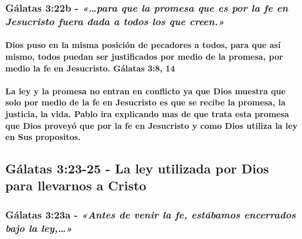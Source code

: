 \documentclass[11a pt,twoside]{article}
\newcommand{\scripture}[1]{%
  {\fontsize{12pt}{16pt}\selectfont\ScriptureFont\itshape #1}%
}
\let\oldsubsection\subsection
\renewcommand{\subsection}{\needspace{5\baselineskip}\oldsubsection}
\let\oldsubsubsection\subsubsection
\renewcommand{\subsubsection}{\needspace{4\baselineskip}\oldsubsubsection}
\let\oldparagraph\paragraph
\renewcommand{\paragraph}{\needspace{3\baselineskip}\oldparagraph}
\begin{document}
\subsubsection{\texorpdfstring{Gálatas 3:22b -
\scripture{«…para que la promesa que es por la fe en Jesucristo fuera dada a todos los que creen.»}}{Gálatas 3:22b - }}\label{guxe1latas-322b---para-que-la-promesa-que-es-por-la-fe-en-jesucristo-fuera-dada-a-todos-los-que-creen.}

\paragraph{Dios puso en la misma posición de pecadores a todos, para que
así mismo, todos puedan ser justificados por medio de la promesa, por
medio la fe en Jesucristo. Gálatas 3:8,
14}\label{dios-puso-en-la-misma-posiciuxf3n-de-pecadores-a-todos-para-que-asuxed-mismo-todos-puedan-ser-justificados-por-medio-de-la-promesa-por-medio-la-fe-en-jesucristo.-guxe1latas-38-14}

\paragraph{La ley y la promesa no entran en conflicto ya que Dios
muestra que solo por medio de la fe en Jesucristo es que se recibe la
promesa, la justicia, la vida. Pablo ira explicando mas de que trata
esta promesa que Dios proveyó que por la fe en Jesucristo y como Dios
utiliza la ley en Sus
propositos.}\label{la-ley-y-la-promesa-no-entran-en-conflicto-ya-que-dios-muestra-que-solo-por-medio-de-la-fe-en-jesucristo-es-que-se-recibe-la-promesa-la-justicia-la-vida.-pablo-ira-explicando-mas-de-que-trata-esta-promesa-que-dios-proveyuxf3-que-por-la-fe-en-jesucristo-y-como-dios-utiliza-la-ley-en-sus-propositos.}

\subsection{Gálatas 3:23-25 - La ley utilizada por Dios para llevarnos a
Cristo}\label{guxe1latas-323-25---la-ley-utilizada-por-dios-para-llevarnos-a-cristo}

\subsubsection{\texorpdfstring{Gálatas 3:23a -
\scripture{«Antes de venir la fe, estábamos encerrados bajo la ley,…»}}{Gálatas 3:23a - }}\label{guxe1latas-323a---antes-de-venir-la-fe-estuxe1bamos-encerrados-bajo-la-ley}
\end{document}
